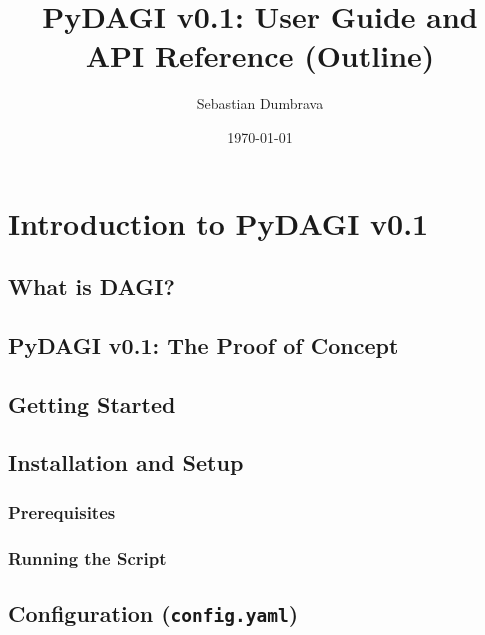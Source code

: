 \documentclass{amsbook}
\title{PyDAGI v0.1: User Guide and API Reference (Outline)}
\author{Sebastian Dumbrava}
\date{\today}
\theoremstyle{definition}
\theoremstyle{remark}
\numberwithin{equation}{chapter} %
\begin{document}

\frontmatter %
\maketitle


\tableofcontents

\mainmatter %

\chapter{Introduction to PyDAGI v0.1}
    \section{What is DAGI?}
    \section{PyDAGI v0.1: The Proof of Concept}
    \section{Getting Started}
    \section{Installation and Setup}
        \subsection{Prerequisites}
        \subsection{Running the Script}
    \section{Configuration (\texttt{config.yaml})}
\end{document}
